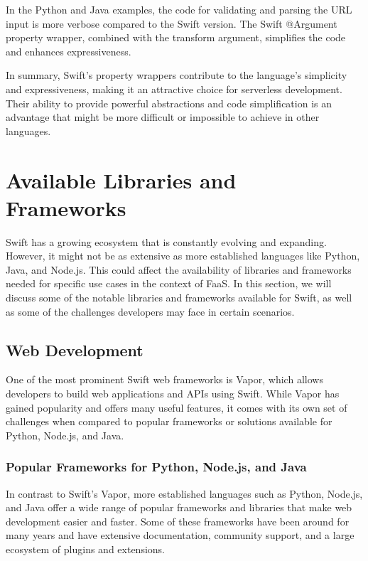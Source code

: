In the Python and Java examples, the code for validating and parsing the URL input is more verbose compared to the Swift version. The Swift @Argument property wrapper, combined with the transform argument, simplifies the code and enhances expressiveness.

In summary, Swift’s property wrappers contribute to the language’s simplicity and expressiveness, making it an attractive choice for serverless development. Their ability to provide powerful abstractions and code simplification is an advantage that might be more difficult or impossible to achieve in other languages.

\section{Available Libraries and Frameworks}

Swift has a growing ecosystem that is constantly evolving and expanding. However, it might not be as extensive as more established languages like Python, Java, and Node.js. This could affect the availability of libraries and frameworks needed for specific use cases in the context of FaaS. In this section, we will discuss some of the notable libraries and frameworks available for Swift, as well as some of the challenges developers may face in certain scenarios.

\subsection{Web Development}

One of the most prominent Swift web frameworks is Vapor, which allows developers to build web applications and APIs using Swift. While Vapor has gained popularity and offers many useful features, it comes with its own set of challenges when compared to popular frameworks or solutions available for Python, Node.js, and Java.

\subsubsection{Popular Frameworks for Python, Node.js, and Java}

In contrast to Swift's Vapor, more established languages such as Python, Node.js, and Java offer a wide range of popular frameworks and libraries that make web development easier and faster. Some of these frameworks have been around for many years and have extensive documentation, community support, and a large ecosystem of plugins and extensions.

